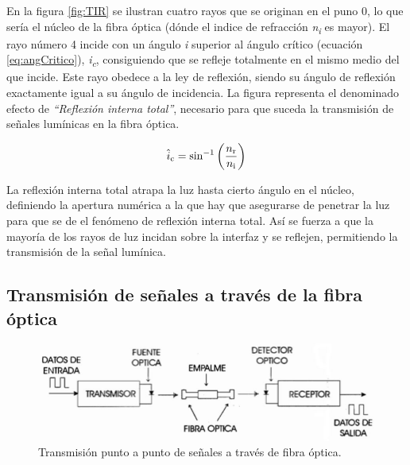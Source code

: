 En la figura \ref{fig:TIR} se ilustran cuatro rayos que se originan en el puno 0, lo que sería el núcleo de la fibra óptica (dónde el indice de refracción \textit{n\textsubscript{i}} es mayor). 
 El rayo número 4 incide con un ángulo \textit{i} superior al ángulo crítico (ecuación \ref{eq:angCritico}), \textit{i\textsubscript{c}}, consiguiendo que se refleje totalmente en el mismo medio del que incide. Este rayo obedece a la ley de reflexión, siendo su ángulo de reflexión exactamente igual a su ángulo de incidencia. La figura representa el denominado efecto de \textit{``Reflexión interna total''}, necesario para que suceda la transmisión de señales lumínicas en la fibra óptica. 

	\begin{equation}
		\label{eq:angCritico}
		\hat{i}\textsubscript{c} =  \sin^{-1}\left(\dfrac{n\textsubscript{r}}{n\textsubscript{i}}\right)
	\end{equation}

 La reflexión interna total atrapa la luz hasta cierto ángulo en el núcleo, definiendo la apertura numérica a la que hay que asegurarse de penetrar la luz para que se de el fenómeno de reflexión interna total. Así se fuerza a que la mayoría de los rayos de luz incidan sobre la interfaz y se reflejen, permitiendo la transmisión de la señal lumínica. 
 
 \subsection{Transmisión de señales a través de la fibra óptica} %
 \label{sec:transmision3}
 
   \begin{figure}[H]
 	\centering
 	\includegraphics[width=1\textwidth]{./img/TxFOp2p}
 	\caption{Transmisión punto a punto de señales a través de fibra óptica. \cite{txFO} } 
 	\label{fig:TxFOp2p}
 \end{figure} 
 
